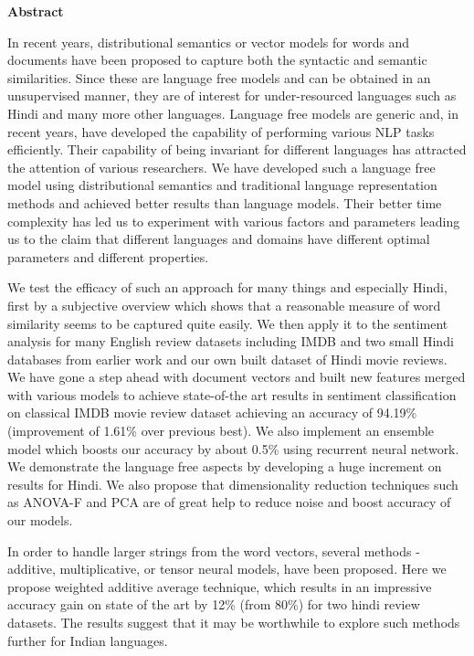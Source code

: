 \cleardoublepage

\begin{center}
	\huge{\textbf{Abstract}}
\end{center}

In recent years, distributional semantics or vector models for words and documents have been proposed to capture both the syntactic and semantic similarities. Since these are language free models and can be obtained in an unsupervised manner, they are of interest for under-resourced languages such as Hindi and many more other languages.
Language free models are generic and, in recent years, have developed the capability of performing various NLP tasks efficiently. Their capability of being invariant for different languages has attracted the attention of various researchers. We have developed such a language free model using distributional semantics and traditional language representation methods and achieved better results than language models. Their better time complexity has led us to experiment with various factors and parameters leading us to the claim that different languages and domains have different optimal parameters and different properties.

We test the efficacy of such an approach for many things and especially Hindi, first by a subjective overview which shows that a reasonable measure of word similarity seems to be captured quite easily.  We then apply it to the sentiment analysis for many English review datasets including IMDB and two small Hindi databases from earlier work and our own built dataset of Hindi movie reviews. 
We have gone a step ahead with document vectors and built new features merged with various models to achieve state-of-the art results in sentiment classification on classical IMDB movie review dataset achieving an accuracy of 94.19\%(improvement of 1.61\% over previous best). We also implement an ensemble model which boosts our accuracy by about 0.5\% using recurrent neural network.
We demonstrate the language free aspects by developing a huge increment on results for Hindi. We also propose that dimensionality reduction techniques such as ANOVA-F and PCA are of great help to reduce noise and boost accuracy of our models.

In order to handle larger strings from the word vectors, several methods - additive, multiplicative, or tensor neural models, have been proposed.  Here we propose weighted additive average technique, which results in an impressive accuracy gain on state of the art by 12\% (from 80\%) for two hindi review datasets.  The results suggest that it may be worthwhile to explore such methods further for Indian languages.\\

